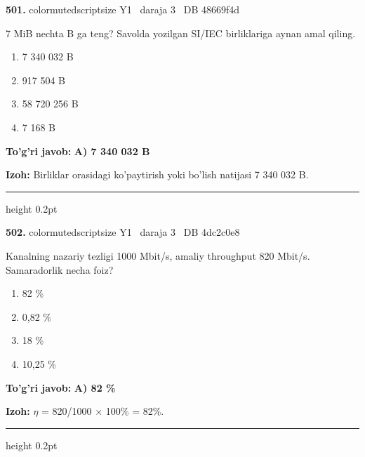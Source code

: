 \documentclass[10pt,a4paper,oneside]{article}
\begin{document}
\noindent\textbf{\color{ink}501.}  {color{muted}scriptsize Y1 \textbullet\ daraja 3 \textbullet\ DB 48669f4d}
\par
7 MiB nechta B ga teng? Savolda yozilgan SI/IEC birliklariga aynan amal qiling.
\begin{enumerate}[label=\Alph*),leftmargin=9mm]
\item 7 340 032 B
\item 917 504 B
\item 58 720 256 B
\item 7 168 B
\end{enumerate}
\begin{tcolorbox}[enhanced,breakable,colback=teal!4,colframe=teal!50!black,boxrule=0.5pt,arc=1.1mm,left=3mm,right=3mm,top=1.7mm,bottom=1.7mm,before skip=2mm,after skip=2mm]
\textbf{\color{teal}To'g'ri javob:} \textbf{A) 7 340 032 B}
\par\smallskip
\textbf{Izoh:} Birliklar orasidagi ko'paytirish yoki bo'lish natijasi 7 340 032 B.
\end{tcolorbox}
\vspace{2mm}\hrule height 0.2pt \vspace{3mm}

\noindent\textbf{\color{ink}502.}  {color{muted}scriptsize Y1 \textbullet\ daraja 3 \textbullet\ DB 4dc2c0e8}
\par
Kanalning nazariy tezligi 1000 Mbit/s, amaliy throughput 820 Mbit/s. Samaradorlik necha foiz?
\begin{enumerate}[label=\Alph*),leftmargin=9mm]
\item 82 \%
\item 0,82 \%
\item 18 \%
\item 10,25 \%
\end{enumerate}
\begin{tcolorbox}[enhanced,breakable,colback=teal!4,colframe=teal!50!black,boxrule=0.5pt,arc=1.1mm,left=3mm,right=3mm,top=1.7mm,bottom=1.7mm,before skip=2mm,after skip=2mm]
\textbf{\color{teal}To'g'ri javob:} \textbf{A) 82 \%}
\par\smallskip
\textbf{Izoh:} \ensuremath{\eta} = 820/1000 \ensuremath{\times} 100\% = 82\%.
\end{tcolorbox}
\vspace{2mm}\hrule height 0.2pt \vspace{3mm}
\end{document}
